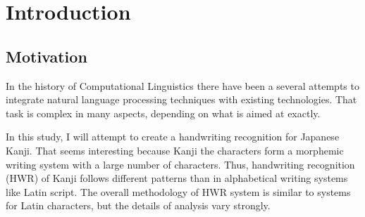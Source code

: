 
\chapter{Introduction}
\label{chap:introduction}
\pagestyle{headings} %

\section{Motivation}
\label{sec:intro:motivation}





In the history of Computational Linguistics there have been a several 
attempts to integrate natural language processing techniques with 
existing technologies. That task is complex in many aspects, depending on what is
aimed at exactly.

In this study, I will attempt to create a handwriting recognition for Japanese 
Kanji. That seems interesting because Kanji the characters form a morphemic 
writing system with a large number of characters. Thus, handwriting 
recognition (HWR) of Kanji follows different patterns than in alphabetical 
writing systems like Latin script. The overall methodology of HWR system is 
similar to systems for Latin characters, but the details of analysis vary 
strongly.

